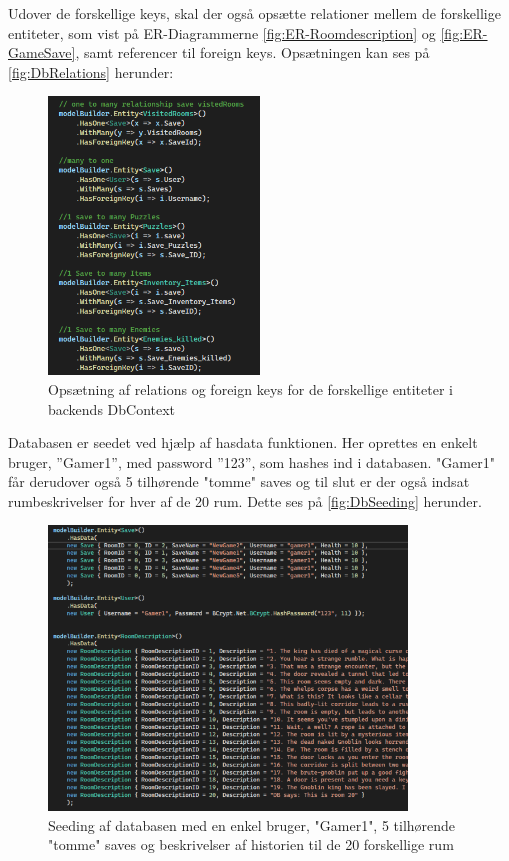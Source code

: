 Udover de forskellige keys, skal der også opsætte relationer mellem de forskellige entiteter, som vist på ER-Diagrammerne \autoref{fig:ER-Roomdescription} og \autoref{fig:ER-GameSave}, samt referencer til foreign keys. 
Opsætningen kan ses på \autoref{fig:DbRelations} herunder: 

\begin{figure}[H]
\centering
\includegraphics[width = 0.5\textwidth]{02-Body/Images/DAL-Database/DbRelations.PNG}
\caption{Opsætning af relations og foreign keys for de forskellige entiteter i backends DbContext}
\label{fig:DbRelations}
\end{figure}

Databasen er seedet ved hjælp af hasdata funktionen. Her oprettes en enkelt bruger, ”Gamer1”, med password ”123”, som hashes ind i databasen. "Gamer1" får derudover også 5 tilhørende "tomme" saves og til slut er der også indsat rumbeskrivelser for hver af de 20 rum. Dette ses på \autoref{fig:DbSeeding} herunder.

\begin{figure}[H]
\centering
\includegraphics[width = 0.85\textwidth]{02-Body/Images/DAL-Database/DbSeeding.PNG}
\caption{Seeding af databasen med en enkel bruger, "Gamer1", 5 tilhørende "tomme" saves og beskrivelser af historien til de 20 forskellige rum}
\label{fig:DbSeeding}
\end{figure}
